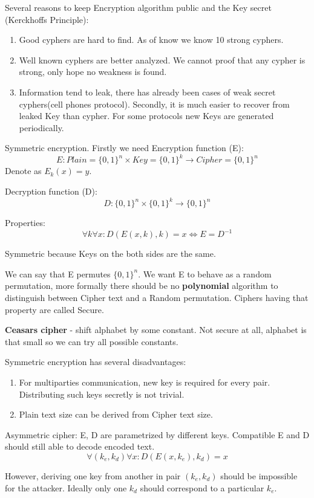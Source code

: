 Several reasons to keep Encryption algorithm public and the Key secret (Kerckhoffs Principle):
\begin{enumerate}
	\item Good cyphers are hard to find. As of know we know 10 strong cyphers.
	\item Well known cyphers are better analyzed. We cannot proof that any cypher is strong, only hope no weakness is found.
	\item Information tend to leak, there has already been cases of weak secret cyphers(cell phones protocol).
		Secondly, it is much easier to recover from leaked Key than cypher. For some protocols new Keys are generated periodically.
\end{enumerate}

\begin{definition}
	Symmetric encryption. Firstly we need Encryption function (E):
	\[ E:Plain = \{0,1\}^n \times Key = \{0,1\}^k \to Cipher=\{0,1\}^n \]
	Denote as $E_k(x) = y$.

	Decryption function (D):
	\[ D:\{0,1\}^n \times \{0,1\}^k \to \{0,1\}^n \]

	Properties:
	\[ \forall k \forall x: D(E(x, k), k) = x \iff E = D^{-1} \]

	Symmetric because Keys on the both sides are the same.
\end{definition}

We can say that E permutes $\{0,1\}^n$. We want E to behave as a random permutation, more formally there should be no \textbf{polynomial} algorithm to distinguish between Cipher text and a Random permutation.
Ciphers having that property are called Secure.

\begin{example}
	\textbf{Ceasars cipher} - shift alphabet by some constant. Not secure at all, alphabet is that small so we can try all possible constants.
\end{example}

Symmetric encryption has several disadvantages:
\begin{enumerate}
	\item For multiparties communication, new key is required for every pair. Distributing such keys secretly is not trivial.
	\item Plain text size can be derived from Cipher text size.
\end{enumerate}

\begin{definition}
	Asymmetric cipher: E, D are parametrized by different keys. Compatible E and D should still able to decode encoded text.
	\[ \forall (k_e, k_d) \forall x: D(E(x, k_e), k_d) = x \]

	However, deriving one key from another in pair $(k_e, k_d)$ should be impossible for the attacker.
	Ideally only one $k_d$ should correspond to a particular $k_e$.
\end{definition}

